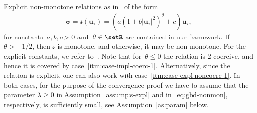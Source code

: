 \documentclass[reqno,a4paper]{amsart}
\def\abs#1{\left| #1 \right|}
\def\vec#1{\boldsymbol{#1}}
\def\bu{\vec{u}}
\def\bsigma{\vec{\sigma}}
\def\Srel{\vec{\mathcal{s}}}
\begin{document}
	\begin{example} \label{ex:gbd-nonmon}
		Explicit non-monotone relations as in~\cite{LeRoux2013} of the form 
		\begin{align*}
			\bsigma = \Srel(\bu_\tau) = \left(a(1 + b \abs{\bu_{\tau}}^2)^{\theta} + c \right)\bu_\tau,				
		\end{align*}
		for constants~$a, b, c >0$ and~$\theta \in \setR$  are contained in our framework.  
		If $\theta>-1/2$, then $\Srel$  is monotone, and otherwise, it may be non-monotone. 
		For the explicit constants, we refer to~\cite{LeRoux2013}. 	
		Note that for~$\theta \leq 0$ the relation is $2$-coercive, and hence it is covered by case~\eqref{itm:case-impl-coerc-1}.  
		Alternatively, since the relation is explicit, one can also work with case~\eqref{itm:case-expl-noncoerc-1}. 
		In both cases, for the purpose of the convergence proof we have to assume that the parameter $\lambda \geq 0$ in Assumption~\ref{assump:s-expl} and in~\eqref{eq:gbd-nonmon}, respectively, is sufficiently small, see    Assumption~\ref{as:param} below.  
	\end{example}
	
\end{document}
